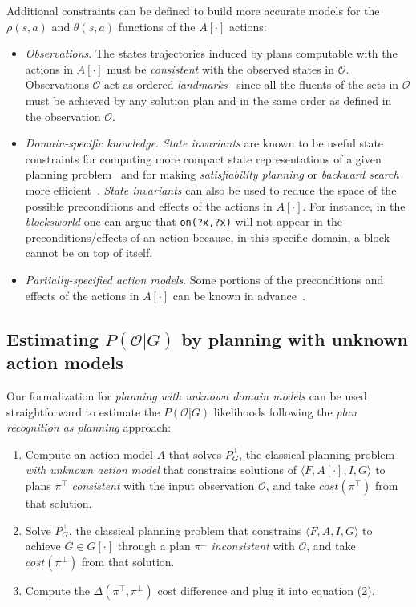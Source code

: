 \documentclass[letterpaper]{article} %
\newcommand{\tup}[1]{{\langle #1 \rangle}}
\begin{document}
Additional constraints can be defined to build more accurate models for the $\rho(s,a)$ and $\theta(s,a)$ functions of the $A[\cdot]$ actions:
\begin{itemize}
\item {\em Observations}. The states trajectories induced by plans computable with the actions in $A[\cdot]$ must be {\em consistent} with the observed states in $\mathcal{O}$. Observations $\mathcal{O}$ act as ordered {\em landmarks}~\cite{hoffmann2004ordered} since all the fluents of the sets in $\mathcal{O}$ must be achieved by any solution plan and in the same order as defined in the observation $\mathcal{O}$.
\item {\em Domain-specific knowledge}. {\em State invariants} are known to be useful state constraints for computing more compact state representations of a given planning problem~\cite{helmert2009concise} and for making {\em satisfiability planning} or {\em backward search} more efficient~\cite{rintanen2014madagascar,alcazar2015reminder}. {\em State invariants} can also be used to reduce the space of the possible preconditions and effects of the actions in $A[\cdot]$. For instance, in the {\em blocksworld} one can argue that {\small\tt on(?x,?x)} will not appear in the preconditions/effects of an action because, in this specific domain, a block cannot be on top of itself.
\item {\em Partially-specified action models}. Some portions of the preconditions and effects of the actions in $A[\cdot]$ can be known in advance~\cite{ZhuoNK13,sreedharan2018handling,pereira2018heuristic}.
\end{itemize}

\subsection{Estimating $P(\mathcal{O}|G)$ by planning with unknown action models}
Our formalization for {\em planning with unknown domain models} can be used straightforward to estimate the $P(\mathcal{O}|G)$ likelihoods following the {\em plan recognition as planning} approach:
\begin{enumerate}
\item Compute an action model $A$ that solves {\em $P^{\top}_G$}, the classical planning problem {\em with unknown action model} that constrains solutions of $\tup{F,A[\cdot],I,G}$ to plans $\pi^\top$ {\em consistent} with the input observation $\mathcal{O}$, and take $cost(\pi^\top)$ from that solution.
\item Solve $P^{\bot}_G$, the classical planning problem that constrains $\tup{F,A,I,G}$ to achieve $G\in G[\cdot]$ through a plan $\pi^\bot$ {\em inconsistent} with $\mathcal{O}$, and take $cost(\pi^\bot)$ from that solution.
\item Compute the $\Delta(\pi^\top,\pi^\bot)$ cost difference and plug it into equation (2).
\end{enumerate}
\end{document}
